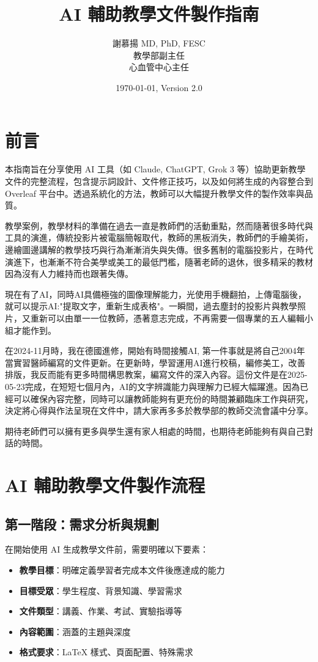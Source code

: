 \documentclass[12pt,a4paper]{article}
\title{\textbf{AI 輔助教學文件製作指南}}
\author{謝慕揚 MD, PhD, FESC\\教學部副主任\\心血管中心主任 }
\date{\today, Version 2.0}
\begin{document}
\maketitle

\tableofcontents
\newpage

\section{前言}

本指南旨在分享使用 AI 工具（如 Claude, ChatGPT, Grok 3 等）協助更新教學文件的完整流程，包含提示詞設計、文件修正技巧，以及如何將生成的內容整合到 Overleaf 平台中。透過系統化的方法，教師可以大幅提升教學文件的製作效率與品質。

教學案例，教學材料的準備在過去一直是教師們的活動重點，然而隨著很多時代與工具的演進，傳統投影片被電腦簡報取代，教師的黑板消失，教師們的手繪美術，邊繪圖邊講解的教學技巧與行為漸漸消失與失傳。很多舊制的電腦投影片，在時代演進下，也漸漸不符合美學或美工的最低門檻，隨著老師的退休，很多精采的教材因為沒有人力維持而也跟著失傳。

現在有了AI，同時AI具備極強的圖像理解能力，光使用手機翻拍，上傳電腦後，就可以提示AI:"提取文字，重新生成表格"。一瞬間，過去塵封的投影片與教學照片，又重新可以由單一一位教師，憑著意志完成，不再需要一個專業的五人編輯小組才能作到。

在2024-11月時，我在德國進修，開始有時間接觸AI, 第一件事就是將自己2004年當實習醫師編寫的文件更新。在更新時，學習運用AI進行校稿，編修美工，改善排版，我反而能有更多時間構思教案，編寫文件的深入內容。這份文件是在2025-05-23完成，在短短七個月內，AI的文字辨識能力與理解力已經大幅躍進。因為已經可以確保內容完整，同時可以讓教師能夠有更充份的時間兼顧臨床工作與研究，決定將心得與作法呈現在文件中，請大家再多多於教學部的教師交流會議中分享。

期待老師們可以擁有更多與學生還有家人相處的時間，也期待老師能夠有與自己對話的時間。

\section{AI 輔助教學文件製作流程}

\subsection{第一階段：需求分析與規劃}

在開始使用 AI 生成教學文件前，需要明確以下要素：

\begin{itemize}
    \item \textbf{教學目標}：明確定義學習者完成本文件後應達成的能力
    \item \textbf{目標受眾}：學生程度、背景知識、學習需求
    \item \textbf{文件類型}：講義、作業、考試、實驗指導等
    \item \textbf{內容範圍}：涵蓋的主題與深度
    \item \textbf{格式要求}：LaTeX 樣式、頁面配置、特殊需求
\end{itemize}
\end{document}
